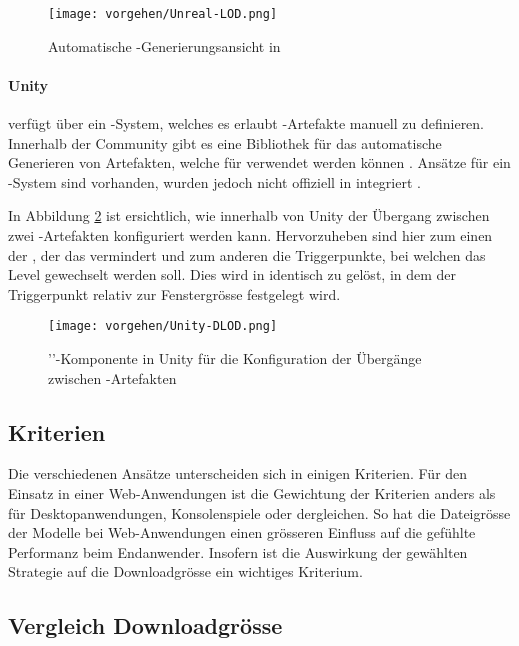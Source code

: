 \begin{figure}[H]
  \centering
  \texttt{[image: vorgehen/Unreal-LOD.png]}
  \caption{Automatische -Generierungsansicht in  \cite{unrealAutoLod}}
  \label{fig:unrealLODGeneration}
\end{figure}

\paragraph{Unity}

 verfügt über ein -System, welches es erlaubt -Artefakte manuell zu definieren.
Innerhalb der  Community gibt es eine Bibliothek für das automatische Generieren von Artefakten, welche für  verwendet werden können \cite{unityMeshSimplification}.
Ansätze für ein -System sind vorhanden, wurden jedoch nicht offiziell in  integriert \cite{unityAutoLod}.

In Abbildung \ref{fig:unityDLODGroup} ist ersichtlich, wie innerhalb von Unity der Übergang zwischen zwei -Artefakten konfiguriert werden kann. Hervorzuheben sind hier zum einen der , der das  vermindert und zum anderen die Triggerpunkte, bei welchen das Level gewechselt werden soll.
Dies wird in  identisch zu  gelöst, in dem der Triggerpunkt relativ zur Fenstergrösse festgelegt wird.

\begin{figure}[H]
  \centering
  \texttt{[image: vorgehen/Unity-DLOD.png]}
  \caption{''-Komponente in Unity für die Konfiguration der Übergänge zwischen -Artefakten}
  \label{fig:unityDLODGroup}
\end{figure}

\subsection{Kriterien}

Die verschiedenen Ansätze unterscheiden sich in einigen Kriterien. Für den Einsatz in einer Web-Anwendungen ist die Gewichtung der Kriterien anders als für Desktopanwendungen, Konsolenspiele oder dergleichen.
So hat die Dateigrösse der Modelle bei Web-Anwendungen einen grösseren Einfluss auf die gefühlte Performanz beim Endanwender. Insofern ist die Auswirkung der gewählten Strategie auf die Downloadgrösse ein wichtiges Kriterium.

\subsection{Vergleich Downloadgrösse}

